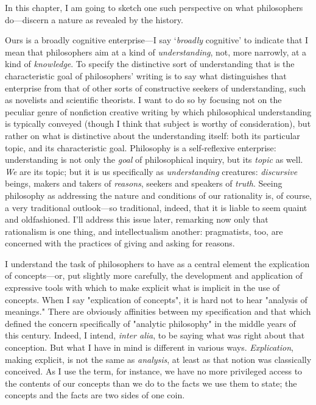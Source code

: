 In this chapter, I am going to sketch one such perspective on what
philosophers do---discern a nature as revealed by the history.

Ours is a broadly cognitive enterprise---I say `\emph{broadly}
cognitive' to indicate that I mean that philosophers aim at a kind of
\emph{understanding}, not, more narrowly, at a kind of \emph{knowledge}.
To specify the distinctive sort of understanding that is the
characteristic goal of philosophers' writing is to say what
distinguishes that enterprise from that of other sorts of constructive
seekers of understanding, such as novelists and scientific theorists. I
want to do so by focusing not on the peculiar genre of nonfiction
creative writing by which philosophical understanding is typically
conveyed (though I think that subject is worthy of consideration), but
rather on what is distinctive about the understanding itself: both its
particular topic, and its characteristic goal. Philosophy is a
self-reflexive enterprise: understanding is not only the \emph{goal} of
philosophical inquiry, but its \emph{topic} as well. \emph{We} are its
topic; but it is us specifically as \emph{understanding} creatures:
\emph{discursive} beings, makers and takers of \emph{reasons}, seekers
and speakers of \emph{truth}. Seeing philosophy as addressing the nature
and conditions of our rationality is, of course, a very traditional
outlook---so traditional, indeed, that it is liable to seem quaint and
oldfashioned. I'll address this issue later, remarking now only that
rationalism is one thing, and intellectualism another: pragmatists, too,
are concerned with the practices of giving and asking for reasons.

I understand the task of philosophers to have as a central element the
explication of concepts---or, put slightly more carefully, the
development and application of expressive tools with which to make
explicit what is implicit in the use of concepts. When I say
"explication of concepts", it is hard not to hear "analysis of
meanings." There are obviously affinities between my specification and
that which defined the concern specifically of "analytic philosophy" in
the middle years of this century. Indeed, I intend, \emph{inter alia},
to be saying what was right about that conception. But what I have in
mind is different in various ways. \emph{Explication}, making explicit,
is not the same as \emph{analysis}, at least as that notion was
classically conceived. As I use the term, for instance, we have no more
privileged access to the contents of our concepts than we do to the
facts we use them to state; the concepts and the facts are two sides of
one coin.

